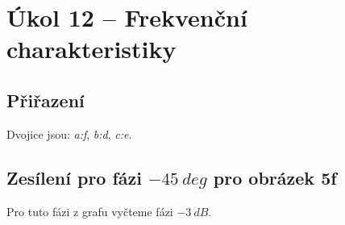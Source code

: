 \documentclass[a4paper,12pt]{article}
\begin{document}
\section{Úkol 12 -- Frekvenční charakteristiky}
\subsection{Přiřazení}
Dvojice jsou: \textit{a:f}, \textit{b:d}, \textit{c:e}.

\subsection{Zesílení pro fázi $-45\ deg$ pro obrázek 5f}
Pro tuto fázi z grafu vyčteme fázi $-3\ dB$.
\end{document}
